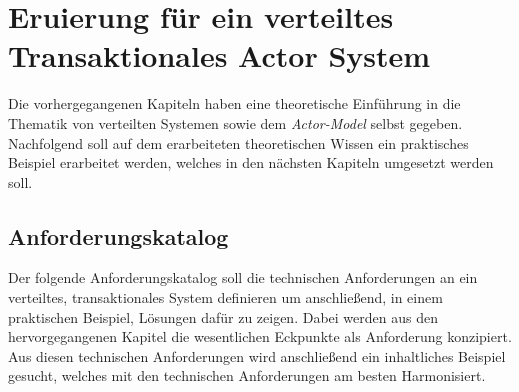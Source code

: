 \chapter{Eruierung für ein verteiltes Transaktionales Actor System} \label{cha:Eruierung}
Die vorhergegangenen Kapiteln haben eine theoretische Einführung in die Thematik von verteilten Systemen sowie dem \textit{Actor-Model} selbst gegeben. Nachfolgend soll auf dem erarbeiteten theoretischen Wissen ein praktisches Beispiel erarbeitet werden, welches in den nächsten Kapiteln umgesetzt werden soll.  

\section{Anforderungskatalog}\label{sec:Eruierung:technicalRequierements}
Der folgende Anforderungskatalog soll die technischen Anforderungen an ein verteiltes, transaktionales System definieren um anschließend, in einem praktischen Beispiel, Lösungen dafür zu zeigen. Dabei werden aus den hervorgegangenen Kapitel die  wesentlichen Eckpunkte als Anforderung konzipiert. Aus diesen technischen Anforderungen wird anschließend ein inhaltliches Beispiel gesucht, welches mit den technischen Anforderungen am besten Harmonisiert.
% 
% 

